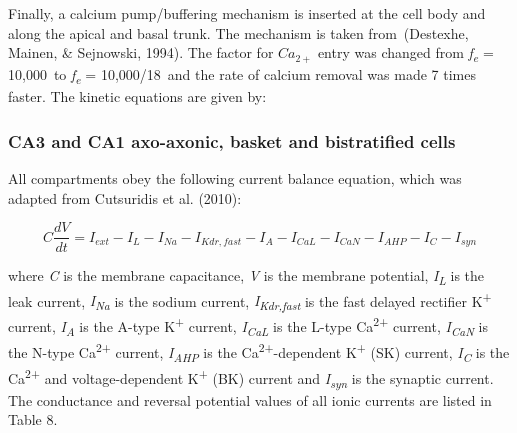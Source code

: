 \documentclass[a4paper]{article}
\begin{document}
Finally, a calcium pump/buffering mechanism is inserted at the cell body and along the apical and basal trunk. The
mechanism is taken from~(Destexhe, Mainen, \& Sejnowski, 1994). The factor for
$Ca_{2+}$ entry was changed from
\textit{f}\textit{\textsubscript{e}}\textit{ }=\textit{ }10,000~to \textit{f}\textit{\textsubscript{e}}\textit{
}=\textit{ }10,000/18~and the rate of calcium removal was made 7 times faster. The kinetic equations are given by:





\bigskip


\bigskip


\bigskip

\subsubsection{CA3 and CA1 axo-axonic, basket and bistratified cells}

All compartments obey the following current balance equation, which was adapted from Cutsuridis et al. (2010):


\begin{equation}
C\frac{dV}{dt}=I_{ext}-I_L-I_{Na}-I_{Kdr, fast}-I_A-I_{CaL}-I_{CaN}-I_{AHP}-I_C-I_{syn}
\end{equation}


where \textit{C} is the membrane capacitance, \textit{V} is the membrane potential, \textit{I}\textit{\textsubscript{L}}
is the leak current, \textit{I}\textit{\textsubscript{Na}} is the sodium current,
\textit{I}\textit{\textsubscript{Kdr,fast}} is the fast delayed rectifier K\textsuperscript{+} current,
\textit{I}\textit{\textsubscript{A}} is the A-type K\textsuperscript{+} current, \textit{I}\textit{\textsubscript{CaL}}
is the L-type Ca\textsuperscript{2+} current, \textit{I}\textit{\textsubscript{CaN}} is the N-type
Ca\textsuperscript{2+} current, \textit{I}\textit{\textsubscript{AHP}} is the Ca\textsuperscript{2+}-dependent
K\textsuperscript{+} (SK) current, \textit{I}\textit{\textsubscript{C}} is the Ca\textsuperscript{2+} and
voltage-dependent K\textsuperscript{+} (BK) current and \textit{I}\textit{\textsubscript{syn}} is the synaptic current.
The conductance and reversal potential values of all ionic currents are listed in Table 8. \ \ 
\end{document}
